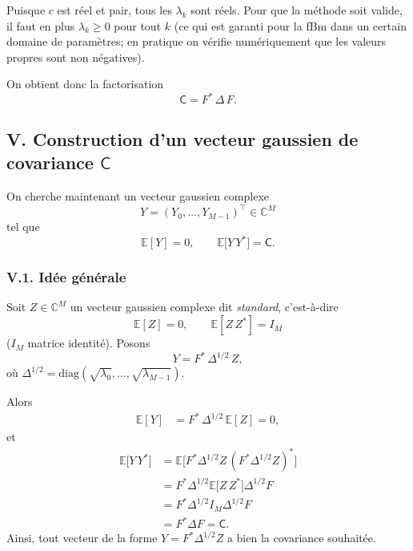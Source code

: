 \documentclass[11pt,a4paper]{article}
\newcommand{\C}{\mathbb{C}}
\newcommand{\E}{\mathbb{E}}
\newcommand{\1}{\mathbf{1}}
\begin{document}
Puisque $c$ est réel et pair, tous les $\lambda_k$ sont réels.
Pour que la méthode soit valide, il faut en plus
$\lambda_k\ge 0$ pour tout $k$ (ce qui est garanti pour la fBm
dans un certain domaine de paramètres; en pratique on vérifie
numériquement que les valeurs propres sont non négatives).

On obtient donc la factorisation
\begin{equation}
  \mathsf{C} = F^{\ast}\,\Delta\,F.
\end{equation}

\subsection*{V. Construction d'un vecteur gaussien de covariance $\mathsf{C}$}

On cherche maintenant un vecteur gaussien complexe
\[
  Y = (Y_0,\dots,Y_{M-1})^\top \in\C^M
\]
tel que
\begin{equation}
  \E[Y] = 0,
  \qquad
  \E\bigl[ Y\,Y^{\ast} \bigr] = \mathsf{C}.
\end{equation}

\subsubsection*{V.1. Idée générale}

Soit $Z\in\C^M$ un vecteur gaussien complexe dit \emph{standard},
c'est-à-dire
\begin{equation}
  \E[Z] = 0,
  \qquad
  \E[Z\,Z^{\ast}] = I_M
\end{equation}
($I_M$ matrice identité). Posons
\begin{equation}
  Y = F^{\ast}\,\Delta^{1/2}\,Z,
\end{equation}
où $\Delta^{1/2}=\mathrm{diag}(\sqrt{\lambda_0},\dots,
\sqrt{\lambda_{M-1}})$.

Alors
\begin{align}
  \E[Y]
  &= F^{\ast}\,\Delta^{1/2}\,\E[Z]
   = 0,
\end{align}
et
\begin{align}
  \E\bigl[Y\,Y^{\ast}\bigr]
  &= \E\bigl[
      F^{\ast}\Delta^{1/2}Z
      \, (F^{\ast}\Delta^{1/2}Z)^{\ast}
    \bigr] \\[0.3em]
  &= F^{\ast}\Delta^{1/2}
     \E\bigl[
       Z\,Z^{\ast}
     \bigr]
     \Delta^{1/2}F \\[0.3em]
  &= F^{\ast}\Delta^{1/2}
     I_M
     \Delta^{1/2}F \\[0.3em]
  &= F^{\ast}\Delta F
   = \mathsf{C}.
\end{align}
Ainsi, tout vecteur de la forme $Y=F^{\ast}\Delta^{1/2}Z$ a bien la
covariance souhaitée.
\end{document}
